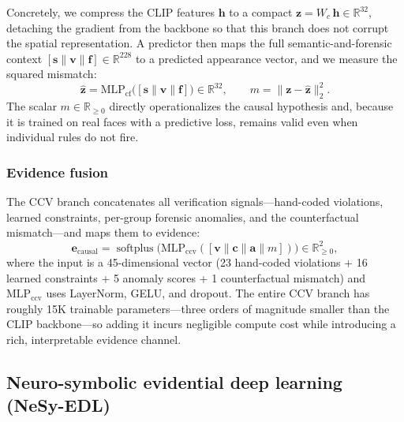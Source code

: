 \documentclass{article}
\begin{document}
Concretely, we compress the CLIP features $\bm{h}$ to a compact $\bm{z} = W_c\, \bm{h} \in \mathbb{R}^{32}$, detaching the gradient from the backbone so that this branch does not corrupt the spatial representation. A predictor then maps the full semantic-and-forensic context $[\bm{s} \| \bm{v} \| \bm{f}] \in \mathbb{R}^{228}$ to a predicted appearance vector, and we measure the squared mismatch:
\begin{equation}
  \hat{\bm{z}} = \text{MLP}_\text{cf}\bigl([\bm{s} \| \bm{v} \| \bm{f}]\bigr) \in \mathbb{R}^{32},
  \quad\quad
  m = \|\bm{z} - \hat{\bm{z}}\|_2^2.
  \label{eq:counterfactual}
\end{equation}
The scalar $m \in \mathbb{R}_{\geq 0}$ directly operationalizes the causal hypothesis and, because it is trained on real faces with a predictive loss, remains valid even when individual rules do not fire.


\subsubsection{Evidence fusion}

The CCV branch concatenates all verification signals---hand-coded violations, learned constraints, per-group forensic anomalies, and the counterfactual mismatch---and maps them to evidence:
\begin{equation}
  \bm{e}_\text{causal} = \operatorname{softplus}\bigl(\text{MLP}_\text{ccv}([\bm{v} \| \bm{c} \| \bm{a} \| m])\bigr) \in \mathbb{R}^2_{\geq 0},
  \label{eq:ccv_evidence}
\end{equation}
where the input is a 45-dimensional vector (23 hand-coded violations + 16 learned constraints + 5 anomaly scores + 1 counterfactual mismatch) and $\text{MLP}_\text{ccv}$ uses LayerNorm, GELU, and dropout. The entire CCV branch has roughly 15K trainable parameters---three orders of magnitude smaller than the CLIP backbone---so adding it incurs negligible compute cost while introducing a rich, interpretable evidence channel.


\subsection{Neuro-symbolic evidential deep learning (NeSy-EDL)}
\label{sec:edl}
\end{document}
